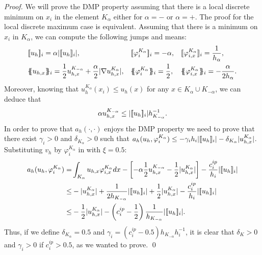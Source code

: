 \begin{proof}
We will prove the DMP property assuming that there is a local discrete minimum on $x_i$ in the element $K_\alpha$ either for $\alpha = -$ or $\alpha = +$. The proof for the local discrete maximum case is equivalent. %
Assuming that there is a minimum on $x_i$ in $K_\alpha$, we can compute the following jumps and means:
\begin{align}\label{eq-identities}
&\jump{u_h}_i = \alpha |\jump{u_h}_i|, & & 
\jump{\varphi_i^{K_\alpha}}_i = -\alpha,    & &
\jump{\varphi_{i,x}^{K_\alpha}}_i = \frac{1}{h_\alpha},\\
&\mean{ u_{h,x}}_i = \half  u_{h,x}^{K_{-\alpha}} + \frac{\alpha}{2}|\nabla u_{h,x}^{K_{\alpha}}|, & &
\mean{\varphi_i^{K_\alpha}}_i = \half, & &
\mean{\varphi_{i,x}^{K_\alpha}}_i = -\frac{\alpha}{2h_\alpha}.
\end{align}
Moreover, knowing that $u^{K_\alpha}_h(x_i)\leq u_h(x)$ for any $x\in K_\alpha\cup K_{-\alpha}$, we can deduce that $$\alpha u_{h,x}^{K_{-\alpha}}\leq |\lbrack\!\lbrack u_h \rbrack\!\rbrack_i|h^{-1}_{K_{-\alpha}}.$$ 
In order to prove that $a_h(\cdot,\cdot)$ enjoys the DMP property we need to prove that there exist $\gamma_i>0$ and $\delta_{K_\alpha}>0$ such that $a_h(u_h,\varphi_i^{K_\alpha}) \leq  - \gamma_i {h}_i |\lbrack\!\lbrack u_h \rbrack\!\rbrack_i| - \delta_{K_\alpha} | u_{h,x}^{K_{\alpha}}|$. Substituting $v_h$ by $\varphi_i^{K_\alpha}$ in  with $\xi=0.5$:
\begin{align*}
a_h(u_h,\varphi_i^{K_\alpha}) = &  \int_{K_\alpha}  u_{h,x}\varphi_{i,x}^{K_\alpha} dx  
 -   \left[
-\alpha\half  u_{h,x}^{K_{-\alpha}} - \frac{1}{2}|u_{h,x}^{K_{\alpha}}|\right]  - \frac{c^{ip}_i}{ {h}_i} |\jump{u_h}_i| \\
\leq & -  |u_{h,x}^{K_{\alpha}}|  + \frac{1}{2h_{K_{-\alpha}}}|\jump{ u_{h}}_i| + \frac{1}{2}|u_{h,x}^{K_{\alpha}}|  - \frac{c^{ip}_i}{ {h}_i} |\jump{u_h}_i|\\
\leq & -\half  |u_{h,x}^{K_{\alpha}}| - \left(c^{ip}_i - \frac{1}{2} \right)\frac{1}{h_{K_{-\alpha}}} | \jump{u_h}_i|. 
\end{align*}
Thus, if we define $\delta_{K_\alpha}=0.5$ and $\gamma_i=(c^{ip}_i- 0.5 )h_{K_{-\alpha}}{h}_i^{-1}$, it is clear that $\delta_K>0$ and $\gamma_i>0$ if $c_i^{ip}>0.5$, as we wanted to prove. \qed
\end{proof}


